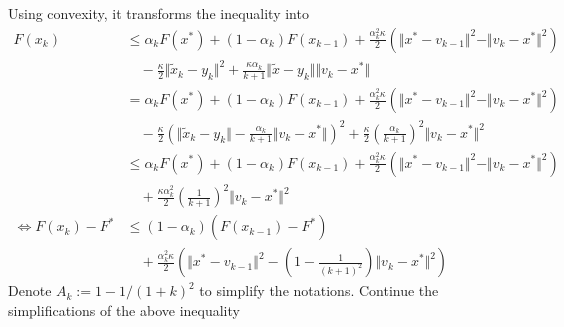 \documentclass[12pt]{article}
\begin{document}
        Using convexity, it transforms the inequality into 
        \begin{align*}
            F(x_k) &\le 
            \alpha_k F(x^*) + (1 - \alpha_k) F(x_{k - 1}) 
            + \frac{\alpha_k^2\kappa}{2}\left(
                \Vert x^* - v_{k - 1}\Vert^2 - 
                \Vert v_k - x^*\Vert^2
            \right)
            \\
            &\quad 
                - \frac{\kappa}{2}\Vert \tilde x_k - y_k\Vert^2 
                + \frac{\kappa \alpha_k}{k + 1}\Vert \tilde x - y_k\Vert\Vert v_k - x^*\Vert
            \\
            &=
            \alpha_k F(x^*) + (1 - \alpha_k) F(x_{k - 1}) 
            + \frac{\alpha_k^2\kappa}{2}\left(
                \Vert x^* - v_{k - 1}\Vert^2 - 
                \Vert v_k - x^*\Vert^2
            \right)
                \\
                &\quad 
                - \frac{\kappa}{2}\left(
                    \Vert \tilde x_k - y_k\Vert
                    - \frac{\alpha_k}{k + 1}\Vert v_k - x^*\Vert
                \right)^2 
                + \frac{\kappa}{2}\left(\frac{\alpha_k}{k + 1}\right)^2\Vert v_k - x^*\Vert^2
            \\ 
            &\le 
            \alpha_k F(x^*) + (1 - \alpha_k) F(x_{k - 1}) 
            + \frac{\alpha_k^2 \kappa}{2}\left(
                \Vert x^* - v_{k - 1}\Vert^2 - 
                \Vert v_k - x^*\Vert^2
            \right)
                \\
                &\quad  
                + \frac{\kappa \alpha_k^2}{2}\left(\frac{1}{k + 1}\right)^2\Vert v_k - x^*\Vert^2
            \\
            \iff 
            F(x_k) - F^*
            &\le 
            (1 - \alpha_k)(F(x_{k - 1}) - F^*)
            \\ &\quad 
                + 
                \frac{\alpha_k^2\kappa}{2}
                \left(
                    \Vert x^* - v_{k - 1}\Vert^2
                    - \left(
                        1 - \frac{1}{(k + 1)^2}
                    \right)\Vert v_k - x^*\Vert^2
                \right)
        \end{align*}
        Denote $A_k := 1 - 1/(1 + k)^2$ to simplify the notations. 
        Continue the simplifications of the above inequality
\end{document}
